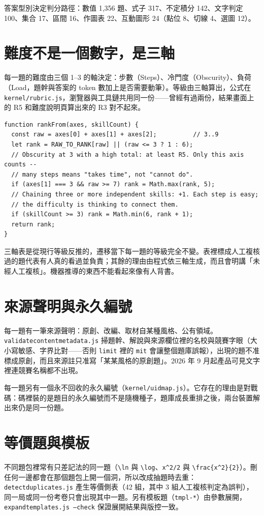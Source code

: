 \documentclass[11pt,a4paper,oneside]{report}
\renewcommand{\_}{\ifmmode\origunderscore\else\textunderscore\allowbreak\fi}
\newcommand{\code}[1]{\texttt{#1}}
\newcommand{\file}[1]{\texttt{\small #1}}
\begin{document}
答案型別決定判分路徑：數值 1,356 題、式子 317、不定積分 142、文字判定 100、集合 17、區間 16、作圖表 22、互動圖形 24（點位 8、切線 4、選圖 12）。

\section{難度不是一個數字，是三軸}
每一題的難度由三個 1–3 的軸決定：步數（Steps）、冷門度（Obscurity）、負荷（Load，題幹與答案的 token 數加上是否需要動筆）。等級由三軸算出，公式在 \file{kernel/rubric.js}，瀏覽器與工具鏈共用同一份——曾經有過兩份，結果畫面上的 R5 和難度說明頁算出來的 R3 對不起來。

\begin{lstlisting}
function rankFrom(axes, skillCount) {
  const raw = axes[0] + axes[1] + axes[2];          // 3..9
  let rank = RAW_TO_RANK[raw] || (raw <= 3 ? 1 : 6);
  // Obscurity at 3 with a high total: at least R5. Only this axis counts --
  // many steps means "takes time", not "cannot do".
  if (axes[1] === 3 && raw >= 7) rank = Math.max(rank, 5);
  // Chaining three or more independent skills: +1. Each step is easy;
  // the difficulty is thinking to connect them.
  if (skillCount >= 3) rank = Math.min(6, rank + 1);
  return rank;
}
\end{lstlisting}

\begin{decision}
三軸表是從現行等級反推的，遷移當下每一題的等級完全不變。表裡標成人工複核過的題代表有人真的看過並負責；其餘的理由由程式依三軸生成，而且會明講「未經人工複核」。機器推導的東西不能看起來像有人背書。
\end{decision}

\section{來源聲明與永久編號}
每一題有一筆來源聲明：原創、改編、取材自某種風格、公有領域。\file{validate\_content\_metadata.js} 掃題幹、解說與來源欄位裡的名校與競賽字眼（大小寫敏感、字界比對——否則 \code{limit} 裡的 \code{mit} 會讓整個題庫誤報），出現的題不准標成原創，而且來源註只准寫「某某風格的原創題」。2026 年 9 月起產品可見文字裡連競賽名稱都不出現。

每一題另有一個永不回收的永久編號（\file{kernel/uid\_map.js}）。它存在的理由是對戰碼：碼裡裝的是題目的永久編號而不是隨機種子，題庫成長重排之後，兩台裝置解出來仍是同一份題。

\section{等價題與模板}
不同題包裡常有只差記法的同一題（\code{\textbackslash ln} 與 \code{\textbackslash log}、\code{x\string^2/2} 與 \code{\textbackslash frac\{x\string^2\}\{2\}}）。刪任何一邊都會在那個題包上開一個洞，所以改成抽題時去重：\file{detect\_duplicates.js} 產生等價側表（42 組，其中 3 組人工複核判定為誤判），同一局或同一份考卷只會出現其中一題。另有模板題（\code{tmpl-*}）由參數展開，\file{expand\_templates.js --check} 保證展開結果與版控一致。
\end{document}
